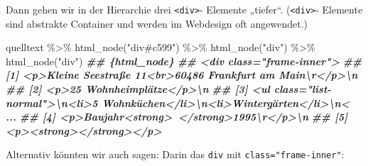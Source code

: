 \documentclass[
  ngerman,
]{article}
\newenvironment{Shaded}{\begin{snugshade}}{\end{snugshade}}
\newcommand{\DocumentationTok}[1]{\textcolor[rgb]{0.56,0.35,0.01}{\textbf{\textit{#1}}}}
\newcommand{\FunctionTok}[1]{\textcolor[rgb]{0.00,0.00,0.00}{#1}}
\newcommand{\NormalTok}[1]{#1}
\newcommand{\SpecialCharTok}[1]{\textcolor[rgb]{0.00,0.00,0.00}{#1}}
\newcommand{\StringTok}[1]{\textcolor[rgb]{0.31,0.60,0.02}{#1}}
\begin{document}
Dann gehen wir in der Hierarchie drei \texttt{\textless{}div\textgreater{}}- Elemente „tiefer``. (\texttt{\textless{}div\textgreater{}}- Elemente sind abstrakte Container und werden im Webdesign oft angewendet.)

\begin{Shaded}
\begin{Highlighting}[]
\NormalTok{quelltext }\SpecialCharTok{\%\textgreater{}\%}
  \FunctionTok{html\_node}\NormalTok{(}\StringTok{"div\#c599"}\NormalTok{) }\SpecialCharTok{\%\textgreater{}\%}
  \FunctionTok{html\_node}\NormalTok{(}\StringTok{"div"}\NormalTok{) }\SpecialCharTok{\%\textgreater{}\%}
  \FunctionTok{html\_node}\NormalTok{(}\StringTok{"div"}\NormalTok{)}
\DocumentationTok{\#\# \{html\_node\}}
\DocumentationTok{\#\# \textless{}div class="frame{-}inner"\textgreater{}}
\DocumentationTok{\#\# [1] \textless{}p\textgreater{}Kleine Seestraße 11\textless{}br\textgreater{}60486 Frankfurt am Main\textbackslash{}r\textless{}/p\textgreater{}\textbackslash{}n}
\DocumentationTok{\#\# [2] \textless{}p\textgreater{}25 Wohnheimplätze\textless{}/p\textgreater{}\textbackslash{}n}
\DocumentationTok{\#\# [3] \textless{}ul class="list{-}normal"\textgreater{}\textbackslash{}n\textless{}li\textgreater{}5 Wohnküchen\textless{}/li\textgreater{}\textbackslash{}n\textless{}li\textgreater{}Wintergärten\textless{}/li\textgreater{}\textbackslash{}n\textless{} ...}
\DocumentationTok{\#\# [4] \textless{}p\textgreater{}Baujahr\textless{}strong\textgreater{} \textless{}/strong\textgreater{}1995\textbackslash{}r\textless{}/p\textgreater{}\textbackslash{}n}
\DocumentationTok{\#\# [5] \textless{}p\textgreater{}\textless{}strong\textgreater{}\textless{}/strong\textgreater{}\textless{}/p\textgreater{}}
\end{Highlighting}
\end{Shaded}

Alternativ könnten wir auch sagen: Darin das \texttt{div} mit \texttt{class="frame-inner"}:
\end{document}
